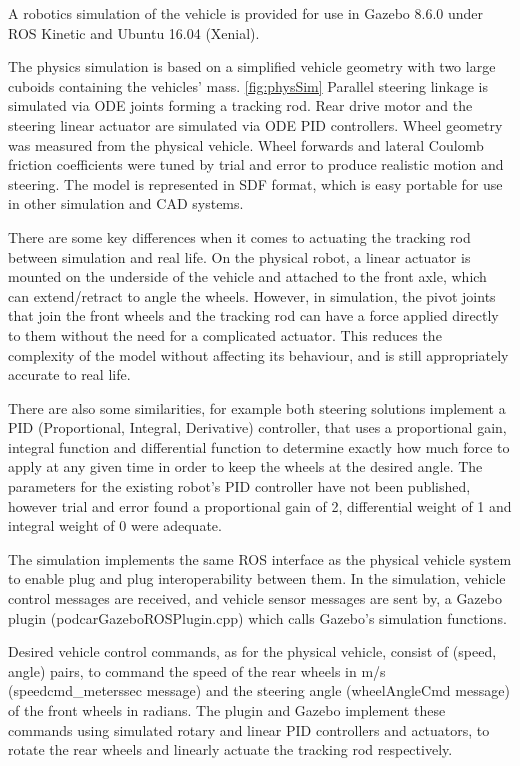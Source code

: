 \documentclass[a4paper]{article}
\begin{document}
A robotics simulation of the vehicle is provided for use in Gazebo 8.6.0 under ROS Kinetic and Ubuntu 16.04 (Xenial).

The physics simulation is based on a simplified vehicle geometry with two large cuboids containing the vehicles’ mass. \ref{fig:physSim} Parallel steering linkage is simulated via ODE joints forming a tracking rod. Rear drive motor and the steering linear actuator are simulated via ODE PID controllers.  Wheel geometry was measured from the physical vehicle.   Wheel forwards and lateral Coulomb friction coefficients were tuned by trial and error to produce realistic motion and steering.  The model is represented in SDF format, which is easy portable for use in other simulation and CAD systems.

There are some key differences when it comes to actuating the tracking rod between simulation and real life. On the physical robot, a linear actuator is mounted on the underside of the vehicle and attached to the front axle, which can extend/retract to angle the wheels. However, in simulation, the pivot joints that join the front wheels and the tracking rod can have a force applied directly to them without the need for a complicated actuator. This reduces the complexity of the model without affecting its behaviour, and is still appropriately accurate to real life.

There are also some similarities, for example both steering solutions implement a PID
(Proportional, Integral, Derivative) controller, that uses a proportional gain, integral function
and differential function to determine exactly how much force to apply at any given time in
order to keep the wheels at the desired angle. The parameters for the existing robot’s PID
controller have not been published, however trial and error found a proportional gain of 2,
differential weight of 1 and integral weight of 0 were adequate.

The simulation implements the same ROS interface as the physical vehicle system to enable plug and plug interoperability between them.  In the simulation, vehicle control messages are received, and vehicle sensor messages are sent by, a Gazebo plugin (podcarGazeboROSPlugin.cpp) which calls Gazebo’s simulation functions.  

Desired vehicle control commands, as for the physical vehicle, consist of (speed, angle) pairs, to command the speed of the rear wheels in m/s (speedcmd\_meterssec message) and the steering angle (wheelAngleCmd message) of the front wheels in radians.  The plugin and Gazebo implement these commands using simulated rotary and linear PID controllers and actuators, to rotate the rear wheels and linearly actuate the tracking rod respectively.
\end{document}
